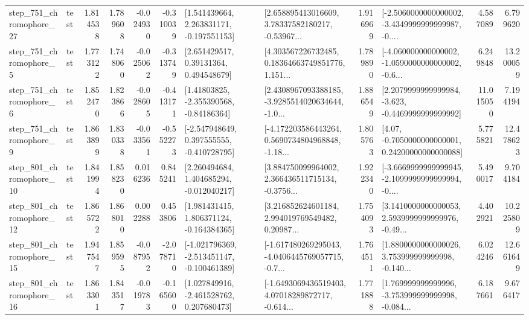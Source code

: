 \begin{tabular}{llrrrrllrlrr}
  step\_751\_chromophore\_27 &      test &      1.814538 &    1.789608 &     -0.024930 & -0.310039 &    [1.541439664, 2.263831171, -0.197551153] &  [2.658895413016609, 3.78337582180217, -0.53967... &       1.916969 &  [-2.5060000000000002, -3.4349999999999987, -0.... &            4.587089 &          6.799620 \\
   step\_751\_chromophore\_5 &      test &      1.773122 &    1.748060 &     -0.025062 & -0.313749 &      [2.651429517, 0.39131364, 0.494548679] &  [4.303567226732485, 0.18364663749851776, 1.151... &       1.789890 &  [-4.060000000000002, -1.0590000000000002, -0.6... &            6.249848 &         13.200059 \\
   step\_751\_chromophore\_6 &      test &      1.852470 &    1.823866 &     -0.028605 & -0.413171 &     [1.41803825, -2.355390568, -0.84186364] &  [2.4308967093388185, -3.9285514020634644, -1.0... &       1.886549 &  [2.2079999999999984, -3.623, -0.4469999999999992] &           11.015050 &          7.194194 \\
   step\_751\_chromophore\_9 &      test &      1.863899 &    1.830338 &     -0.033561 & -0.552273 &   [-2.547948649, 0.397555555, -0.410728795] &  [-4.172203586443264, 0.5690734804968848, -1.18... &       1.805763 &   [4.07, -0.7050000000000001, 0.24200000000000088] &            5.775821 &         12.478623 \\
  step\_801\_chromophore\_10 &      test &      1.841994 &    1.858230 &      0.016236 &  0.845241 &    [2.260494684, 1.404685294, -0.012040217] &  [3.884750099964002, 2.366436511715134, -0.3756... &       1.922340 &  [-3.6669999999999945, -2.1099999999999994, -0.... &            5.490017 &          9.704184 \\
  step\_801\_chromophore\_12 &      test &      1.865722 &    1.868010 &      0.002288 &  0.453806 &    [1.981431415, 1.806371124, -0.164384365] &  [3.216852624601184, 2.994019769549482, 0.20987... &       1.754093 &  [3.1410000000000053, 2.5939999999999976, -0.49... &            4.402921 &         10.225809 \\
  step\_801\_chromophore\_15 &      test &      1.947547 &    1.859595 &     -0.087952 & -2.078710 &  [-1.021796369, -2.513451147, -0.100461389] &  [-1.617480269295043, -4.0406445769057715, -0.7... &       1.764511 &  [1.8800000000000026, 3.753999999999998, -0.140... &            6.024246 &         12.661649 \\
  step\_801\_chromophore\_16 &      test &      1.863301 &    1.843517 &     -0.019783 & -0.165600 &    [1.027849916, -2.461528762, 0.207680473] &  [-1.6493069436519403, 4.07018289872717, -0.614... &       1.771888 &  [1.769999999999996, -3.753999999999998, -0.084... &            6.187661 &          9.676417 \\

\end{tabular}
